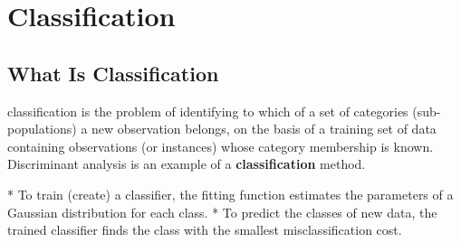 

\pagestyle{fancy}
\setmarginsrb{20mm}{0mm}{20mm}{25mm}{12mm}{11mm}{0mm}{11mm}





\section{Classification}
\subsection{What Is Classification}
classification is the problem of identifying to which of a set of categories (sub-populations) a new observation belongs, on the basis of a training set of data containing observations (or instances) whose category membership is known.
Discriminant analysis is an example of a \textbf{classification} method.



* To train (create) a classifier, the fitting function estimates the parameters of a Gaussian distribution for each class.
* To predict the classes of new data, the trained classifier finds the class with the smallest misclassification cost.

%



